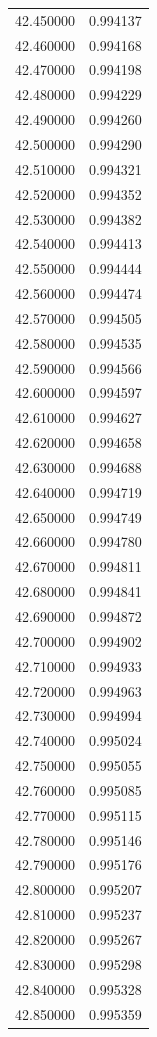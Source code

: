 \begin{tabular}{rr}
42.450000 & 0.994137 \\
42.460000 & 0.994168 \\
42.470000 & 0.994198 \\
42.480000 & 0.994229 \\
42.490000 & 0.994260 \\
42.500000 & 0.994290 \\
42.510000 & 0.994321 \\
42.520000 & 0.994352 \\
42.530000 & 0.994382 \\
42.540000 & 0.994413 \\
42.550000 & 0.994444 \\
42.560000 & 0.994474 \\
42.570000 & 0.994505 \\
42.580000 & 0.994535 \\
42.590000 & 0.994566 \\
42.600000 & 0.994597 \\
42.610000 & 0.994627 \\
42.620000 & 0.994658 \\
42.630000 & 0.994688 \\
42.640000 & 0.994719 \\
42.650000 & 0.994749 \\
42.660000 & 0.994780 \\
42.670000 & 0.994811 \\
42.680000 & 0.994841 \\
42.690000 & 0.994872 \\
42.700000 & 0.994902 \\
42.710000 & 0.994933 \\
42.720000 & 0.994963 \\
42.730000 & 0.994994 \\
42.740000 & 0.995024 \\
42.750000 & 0.995055 \\
42.760000 & 0.995085 \\
42.770000 & 0.995115 \\
42.780000 & 0.995146 \\
42.790000 & 0.995176 \\
42.800000 & 0.995207 \\
42.810000 & 0.995237 \\
42.820000 & 0.995267 \\
42.830000 & 0.995298 \\
42.840000 & 0.995328 \\
42.850000 & 0.995359 \\

\end{tabular}
